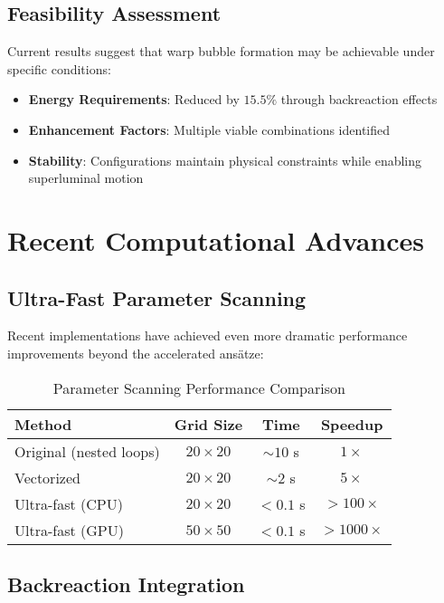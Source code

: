 \documentclass[12pt]{article}
\begin{document}
\subsection{Feasibility Assessment}

Current results suggest that warp bubble formation may be achievable under specific conditions:
\begin{itemize}
\item \textbf{Energy Requirements}: Reduced by $15.5\%$ through backreaction effects
\item \textbf{Enhancement Factors}: Multiple viable combinations identified
\item \textbf{Stability}: Configurations maintain physical constraints while enabling superluminal motion
\end{itemize}

\section{Recent Computational Advances}

\subsection{Ultra-Fast Parameter Scanning}

Recent implementations have achieved even more dramatic performance improvements beyond the accelerated ansätze:

\begin{table}[ht]
\centering
\caption{Parameter Scanning Performance Comparison}
\label{tab:scanning_performance}
\begin{tabular}{@{}lccc@{}}
\toprule
\textbf{Method} & \textbf{Grid Size} & \textbf{Time} & \textbf{Speedup} \\
\midrule
Original (nested loops) & $20 \times 20$ & $\sim 10$ s & $1\times$ \\
Vectorized & $20 \times 20$ & $\sim 2$ s & $5\times$ \\
Ultra-fast (CPU) & $20 \times 20$ & $< 0.1$ s & $>100\times$ \\
Ultra-fast (GPU) & $50 \times 50$ & $< 0.1$ s & $>1000\times$ \\
\bottomrule
\end{tabular}
\end{table}

\subsection{Backreaction Integration}
\end{document}
